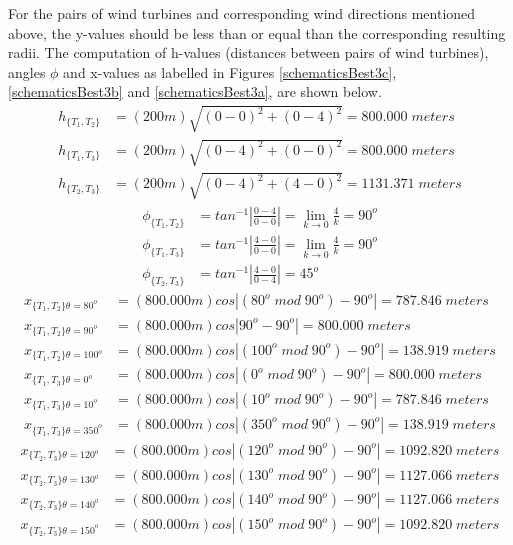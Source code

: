 	For the pairs of wind turbines and corresponding wind directions mentioned above, the y-values should be less than or equal than the corresponding resulting radii. The computation of h-values (distances between pairs of wind turbines), angles $\phi$ and x-values as labelled in Figures \ref{schematicsBest3c}, \ref{schematicsBest3b} and \ref{schematicsBest3a}, are shown below.
	\begin{align*}
	    h_{\{T_1,T_2\}} &= (200m)\sqrt{(0-0)^2+(0-4)^2} = 800.000\;meters \\
	    h_{\{T_1,T_3\}} &= (200m)\sqrt{(0-4)^2+(0-0)^2} = 800.000\;meters \\
	    h_{\{T_2,T_3\}} &= (200m)\sqrt{(0-4)^2+(4-0)^2} = 1131.371\;meters 
	\end{align*}
	\begin{align*}
	    \phi_{\{T_1,T_2\}} &= tan^{-1}\left|\frac{0-4}{0-0}\right| = \lim_{k\rightarrow 0}\frac{4}{k} = 90^o \\
	    \phi_{\{T_1,T_3\}} &= tan^{-1}\left|\frac{4-0}{0-0}\right| = \lim_{k\rightarrow 0}\frac{4}{k} = 90^o \\
	    \phi_{\{T_2,T_3\}} &= tan^{-1}\left|\frac{4-0}{0-4}\right| = 45^o
	\end{align*}
	\begin{align*}
	    x_{\{T_1,T_2\}\theta=80^o}
	    &= (800.000m)cos\left| (80^o\;mod\;90^o) - 90^o \right| = 787.846\;meters \\
	    x_{\{T_1,T_2\}\theta=90^o}
	    &= (800.000m)cos\left| 90^o - 90^o \right| = 800.000\;meters \\
	    x_{\{T_1,T_2\}\theta=100^o}
	    &= (800.000m)cos\left| (100^o\;mod\;90^o) - 90^o \right| = 138.919\;meters
	\end{align*}
	\begin{align*}
	    x_{\{T_1,T_3\}\theta=0^o}
	    &= (800.000m)cos\left| (0^o\;mod\;90^o) - 90^o \right| = 800.000\;meters \\
	    x_{\{T_1,T_3\}\theta=10^o}
	    &= (800.000m)cos\left| (10^o\;mod\;90^o) - 90^o \right| = 787.846\;meters \\
	    x_{\{T_1,T_3\}\theta=350^o}
	    &= (800.000m)cos\left| (350^o\;mod\;90^o) - 90^o \right| = 138.919\;meters
	\end{align*}
	\begin{align*}
	    x_{\{T_2,T_3\}\theta=120^o}
	    &= (800.000m)cos\left| (120^o\;mod\;90^o) - 90^o \right| = 1092.820\;meters \\
	    x_{\{T_2,T_3\}\theta=130^o}
	    &= (800.000m)cos\left| (130^o\;mod\;90^o) - 90^o \right| = 1127.066\;meters \\
	    x_{\{T_2,T_3\}\theta=140^o}
	    &= (800.000m)cos\left| (140^o\;mod\;90^o) - 90^o \right| = 1127.066\;meters \\
	    x_{\{T_2,T_3\}\theta=150^o}
	    &= (800.000m)cos\left| (150^o\;mod\;90^o) - 90^o \right| = 1092.820\;meters
	\end{align*}
	
